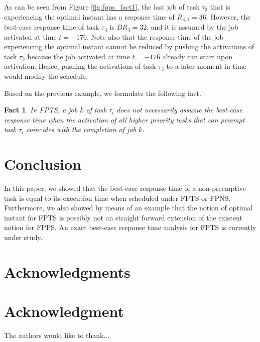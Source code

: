 \documentclass[conference,compsoc]{IEEEtran}
\newtheorem{fact}{Fact}
\begin{document}
As can be seen from Figure \ref{fig:fpps_fact1}, the last job of task $\tau_3$ that is experiencing the optimal instant has a response time of $R_{3,1}=36$. However, the best-case response time of task $\tau_3$ is $BR_3 = 32$, and it is assumed by the job activated at time $t=-176$. Note also that the response time of the job experiencing the optimal instant cannot be reduced by pushing the activations of task $\tau_3$ because the job activated at time $t=-176$ already can start upon activation. Hence, pushing the activations of task $\tau_3$ to a later moment in time would modify the schedule.

Based on the previous example, we formulate the following fact.

\begin{fact}
	In FPTS, a job $k$ of task $\tau_i$ does not necessarily assume the best-case response time when the activation of all higher priority tasks that can preempt task $\tau_i$ coincides with the completion of job $k$.
\end{fact}


\section{Conclusion}
In this paper, we showed that the best-case response time of a non-preemptive task is equal to its execution time when scheduled under FPTS or FPNS. Furthermore, we also showed by means of an example that the notion of optimal instant for FPTS is possibly not an straight forward extension of the existent notion for FPPS. An exact best-case response time analysis for FPTS is currently under study.


\ifCLASSOPTIONcompsoc
  \section*{Acknowledgments}
\else
  \section*{Acknowledgment}
\fi


The authors would like to thank...





\end{document}
